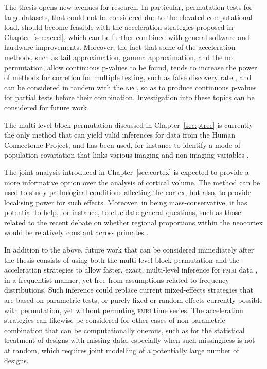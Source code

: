 The thesis opens new avenues for research. In particular, permutation tests for large datasets, that could not be considered due to the elevated computational load, should become feasible with the acceleration strategies proposed in Chapter~\ref{sec:accel}, which can be further combined with general software and hardware improvements. Moreover, the fact that some of the acceleration methods, such as tail approximation, gamma approximation, and the no permutation, allow continuous p-values to be found, tends to increase the power of methods for corretion for multiple testing, such as false discovery rate \citep[\textsc{fdr};][]{Genovese2002}, and can be considered in tandem with the \textsc{npc}, so as to produce continuous p-values for partial tests before their combination. Investigation into these topics can be considered for future work.

The multi-level block permutation discussed in Chapter~\ref{sec:ptree} is currently the only method that can yield valid inferences for data from the Human Connectome Project, and has been used, for instance to identify a mode of population covariation that links various imaging and non-imaging variables \citep{Smith2015}.

The joint analysis introduced in Chapter~\ref{sec:cortex} is expected to provide a more informative option over the analysis of cortical volume. The method can be used to study pathological conditions affecting the cortex, but also, to provide localising power for such effects. Moreover, in being mass-con\-ser\-va\-ti\-ve, it has potential to help, for instance, to elucidate general questions, such as those related to the recent debate on whether regional proportions within the neocortex would be relatively constant across primates \citep{Schoenemann2005, Barton2013, Gabi2016}. 

In addition to the above, future work that can be considered immediately after the thesis consists of using both the multi-level block permutation and the acceleration strategies to allow faster, exact, multi-level inference for \textsc{fmri} data \citep{Woolrich2004}, in a frequentist manner, yet free from assumptions related to frequency distributions. Such inference could replace current mixed-effects strategies that are based on parametric tests, or purely fixed or random-effects currently possible with permutation, yet without permuting \textsc{fmri} time series. The acceleration strategies can likewise be considered for other cases of non-parametric combination that can be computationally onerous, such as for the statistical treatment of designs with missing data, especially when such missingness is not at random, which requires joint modelling of a potentially large number of designs.

